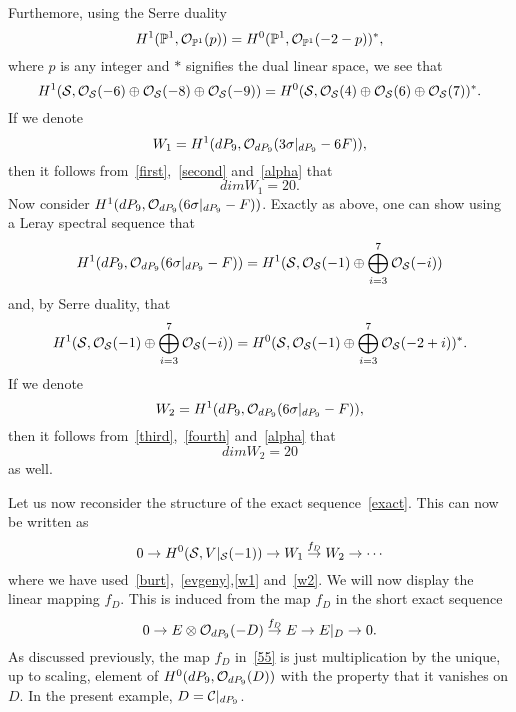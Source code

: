 \documentclass[a4paper,12pt]{article}
\numberwithin{equation}{section}
\theoremstyle{plain}
\begin{document}
%
Furthemore, using the Serre duality
%
\begin{equation}
H^{1}({\mathbb P}^{1}, {\cal O}_{{\mathbb P}^{1}}(p)) =
H^{0}({\mathbb P}^{1}, {\cal O}_{{\mathbb P}^{1}}(-2-p))^{*},
\label{serre}
\end{equation}
%
where $p$ is any integer and $*$ signifies the dual linear space, we see
that
%
\begin{equation}
H^{1} ({\cal S}, {\cal O}_{{\cal S}}(-6) \oplus {\cal O}_{{\cal S}}(-8)
\oplus {\cal O}_{{\cal S}}(-9))=
H^{0} ({\cal S}, {\cal O}_{{\cal S}}(4) \oplus {\cal O}_{{\cal S}}(6)
\oplus {\cal O}_{{\cal S}}(7))^{*}.
\label{second}
\end{equation}
%
If we denote
%
\begin{equation}
W_1 = H^1 (dP_9, {\cal O}_{dP_9} (3 \sigma|_{dP_9} -6F)),
\label{w1}
\end{equation}
%
then it follows from~\eqref{first},~\eqref{second} and~\eqref{alpha} that
%
\begin{equation}
dim W_1 = 20.
\label{53}
\end{equation}
%
Now consider $H^{1}(dP_9, {\cal O}_{dP_9} (6 \sigma|_{dP_9} -F))$.
Exactly as above, one can show using a Leray spectral sequence that
%
\begin{equation}
H^1 (dP_9, {\cal O}_{dP_9} (6 \sigma|_{dP_9} -F))=
H^{1} ({\cal S}, {\cal O}_{{\cal S}}(-1) \oplus
\bigoplus_{i=3}^{7} {\cal O}_{{\cal S}}(-i))
\label{third}
\end{equation}
%
and, by Serre duality, that
%
\begin{equation}
H^{1} ({\cal S}, {\cal O}_{{\cal S}}(-1) \oplus
\bigoplus_{i=3}^{7} {\cal O}_{{\cal S}}(-i))
=
H^{0} ({\cal S}, {\cal O}_{{\cal S}}(-1) \oplus
\bigoplus_{i=3}^{7} {\cal O}_{{\cal S}}(-2+i))^{*}.
\label{fourth}
\end{equation}
%
If we denote
%
\begin{equation}
W_2 = H^{1} (dP_9, {\cal O}_{dP_9} (6 \sigma|_{dP_9} -F)),
\label{w2}
\end{equation}
%
then it follows from~\eqref{third},~\eqref{fourth} and~\eqref{alpha} that
%
\begin{equation}
dim W_2 =20
\label{54}
\end{equation}
%
as well.

Let us now reconsider the structure of the exact sequence~\eqref{exact}.
This can now be written as
%
\begin{equation}
0 \rightarrow H^{0}({\cal S}, V|_{\cal S}(-1))
\rightarrow W_1 \stackrel{f_D}{\rightarrow} W_2 \rightarrow \cdots
\label{ww}
\end{equation}
%
where we have used~\eqref{burt},~\eqref{evgeny},\eqref{w1} and~\eqref{w2}.
We will now display the linear mapping $f_D$. This is induced
from the map $f_D$ in the short exact sequence
%
\begin{equation}
0 \rightarrow E \otimes {\cal O}_{dP_9} (-D)
\stackrel{f_D}{\rightarrow} E
\rightarrow E|_{D} \rightarrow 0.
\label{55}
\end{equation}
%
As discussed previously, the map $f_D$ in~\eqref{55} is just
multiplication
by the unique, up to scaling, element of $H^{0}(dP_9,
{\cal O}_{dP_9} (D))$ with the
property that it vanishes on $D$. In the present example,
$D={\cal{C}}|_{dP_{9}}$.
\end{document}
